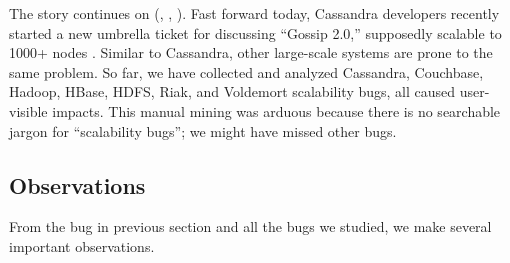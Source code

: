 %
%

The story continues on (, , \etc).  Fast forward today,
Cassandra developers recently started a new umbrella ticket for discussing
``Gossip 2.0,''  supposedly scalable to 1000+
nodes \cite{Gossip20, Gossip20Mail}.
Similar to Cassandra, other large-scale systems are prone to the same
problem.  So far, we have collected and analyzed \totCass Cassandra, \totCouch
Couchbase, \totHadoop Hadoop, \totHBase HBase, \totHDFS HDFS, \totRiak
Riak, and \totVold Voldemort scalability bugs, all caused user-visible
impacts.
%
This manual mining was arduous because there is no searchable jargon for
``scalability bugs''; we might have missed other bugs.
%

\subsection{Observations}
\label{mot-observe}

From the bug in previous section and all the bugs we studied, we make several
important observations.

